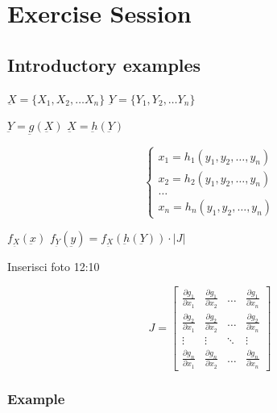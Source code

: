 \setcounter{chapter}{1}
\setchapterabstract{}
\chapter{Exercise Session}
\vspace{-1.5cm}

{\chaptoc\noindent\begin{minipage}[inner sep=0,outer sep=0]{0.9\linewidth}\section{Introductory examples}\end{minipage}}

\( \underbar{X} = \{ X_1, X_2, \ldots X_n \} \)
\( \underbar{Y} = \{ Y_1, Y_2, \ldots Y_n \} \)

\( \underbar{Y} = \underbar{g}(\underbar{X}) \)
\( \underbar{X} = \underbar{h}(\underbar{Y}) \)

\begin{equation}
    \begin{cases}
        x_1 = h_1(y_1, y_2, \ldots, y_n) \\
        x_2 = h_2(y_1, y_2, \ldots, y_n) \\
        \ldots \\
        x_n = h_n(y_1, y_2, \ldots, y_n)
    \end{cases}
\end{equation}

\(f_{\underbar{X}} (\underbar{x})\)
\( f_{\underbar{Y}} (\underbar{y}) = f_{\underbar{X}} (\underbar{h}(\underbar{Y})) \cdot |J| \)

Inserisci foto 12:10

\[
J = \begin{bmatrix}
\frac{{\partial g_1}}{{\partial x_1}} & \frac{{\partial g_1}}{{\partial x_2}} & \ldots & \frac{{\partial g_1}}{{\partial x_n}} \\
\frac{{\partial g_2}}{{\partial x_1}} & \frac{{\partial g_2}}{{\partial x_2}} & \ldots & \frac{{\partial g_2}}{{\partial x_n}} \\
\vdots & \vdots & \ddots & \vdots \\
\frac{{\partial g_n}}{{\partial x_1}} & \frac{{\partial g_n}}{{\partial x_2}} & \ldots & \frac{{\partial g_n}}{{\partial x_n}}
\end{bmatrix}
\]

\subsection{Example}

